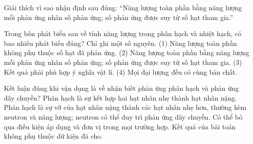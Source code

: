 \begin{bt}
Giải thích vì sao nhận định sau đúng: “Năng lượng toàn phần bằng năng lượng mỗi phản ứng nhân số phản ứng; số phản ứng được suy từ số hạt tham gia.”
\end{bt}

\begin{ex}
Trong bốn phát biểu sau về tính năng lượng trong phân hạch và nhiệt hạch, có bao nhiêu phát biểu đúng? Chỉ ghi một số nguyên. (1) Năng lượng toàn phần không phụ thuộc số hạt đã phản ứng. (2) Năng lượng toàn phần bằng năng lượng mỗi phản ứng nhân số phản ứng; số phản ứng được suy từ số hạt tham gia. (3) Kết quả phải phù hợp ý nghĩa vật lí. (4) Mọi đại lượng đều có cùng bản chất.
\end{ex}

\begin{ex}
Kết luận đúng khi vận dụng là về nhận biết phản ứng phân hạch và phản ứng dây chuyền?
\choice
{Phân hạch là sự kết hợp hai hạt nhân nhẹ thành hạt nhân nặng.}
{\True Phân hạch là sự vỡ của hạt nhân nặng thành các hạt nhân nhẹ hơn, thường kèm neutron và năng lượng; neutron có thể duy trì phản ứng dây chuyền.}
{Có thể bỏ qua điều kiện áp dụng và đơn vị trong mọi trường hợp.}
{Kết quả của bài toán không phụ thuộc dữ kiện đã cho.}
\end{ex}

